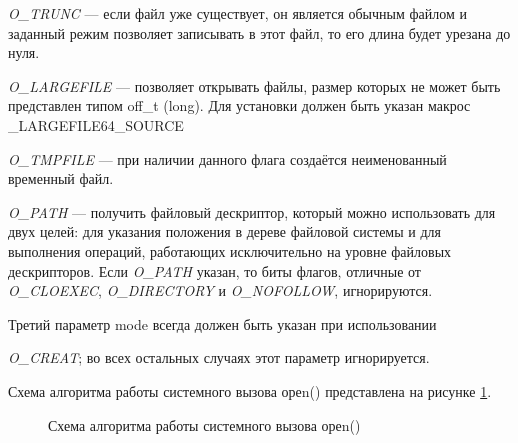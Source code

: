 \textit{O\_TRUNC} — если файл уже существует, он является обычным файлом и заданный режим позволяет записывать в этот файл, то его длина будет урезана до нуля.

\textit{O\_LARGEFILE} — позволяет открывать файлы, размер которых не может быть представлен типом off\_t (long). Для установки должен быть указан макрос \_LARGEFILE64\_SOURCE

\textit{O\_TMPFILE} — при наличии данного флага создаётся неименованный временный файл.

\textit{O\_PATH} — получить файловый дескриптор, который можно использовать для двух целей: для указания положения в дереве файловой системы и для выполнения операций, работающих исключительно на уровне файловых дескрипторов. Если \textit{O\_PATH} указан, то биты флагов,  отличные от \textit{O\_CLOEXEC}, \textit{O\_DIRECTORY} и \textit{O\_NOFOLLOW}, игнорируются.


Третий параметр mode всегда должен быть указан при использовании 

\noindent\textit{O\_CREAT}; во всех остальных случаях этот параметр игнорируется.


Схема алгоритма работы системного вызова ореn() представлена на рисунке \ref{fig:open}.
\clearpage
\begin{figure}[ph!]
	\caption{Схема алгоритма работы системного вызова ореn()}
	\label{fig:open}
\end{figure}

